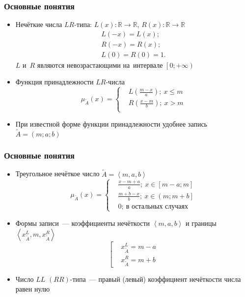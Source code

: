 \documentclass[12pt]{beamer}
\begin{document}
\begin{frame}
  \frametitle{Основные понятия}
  \begin{itemize}
    \item Нечёткие числа $LR$-типа: $L(x):\mathbb{R} \to \mathbb{R}$, $R(x):\mathbb{R} \to \mathbb{R}$
      \begin{gather*}
	    L\left( -x \right)=L\left( x \right); \\
	    R\left( -x \right)=R\left( x \right); \\
	    L\left( 0 \right)=R\left(  0 \right)=1.
      \end{gather*}
      $L$ и~$R$ являются невозрастающими на~интервале $\left[ 0;+\infty  \right)$
    \item Функция принадлежности $LR$-числа
      \begin{equation}
        \mu_{\tilde A}\left( x \right)=\left\{ 
          \begin{aligned}
            & L\left( \frac{m-x}{a} \right);\ x \leqslant m \\ 
			& R\left( \frac{x-m}{b} \right);\ x>m \\ 
		  \end{aligned} 
		\right.
      \end{equation}
    \item При известной форме функции принадлежности удобнее запись $\tilde A = \left(m; a; b \right)$
  \end{itemize}
\end{frame}

\begin{frame}
  \frametitle{Основные понятия}
  \begin{itemize}
    \item Треугольное нечёткое число $\tilde A = \left\langle m,a,b \right\rangle $
      \begin{equation}
        \mu_{\tilde A}\left( x \right)=
        \left\{ \begin{aligned}
			& \frac{x-m+a}{a};\ x\in \left[ m-a;m \right] \\ 
			& \frac{m+b-x}{b};\ x\in \left( m;m+b \right] \\ 
			& 0;\ \text{в остальных случаях} 
	 	\end{aligned} \right.
      \end{equation}
    \item Формы записи~--- коэффициенты нечёткости $\left\langle m,a,b \right\rangle$ и границы $\left\langle x_{\tilde A}^L,m,x_{\tilde A}^R \right\rangle$
      \begin{equation}
        \left[ 
          \begin{aligned}
			 & x_{\tilde A}^L=m-a \\ 
			 & x_{\tilde A}^R=m+b 
		  \end{aligned}
		\right.
	  \end{equation}
    \item Число $LL$ $\left( RR \right)$-типа~--- правый (левый) коэффициент нечёткости числа равен нулю
  \end{itemize}
\end{frame}
\end{document}
